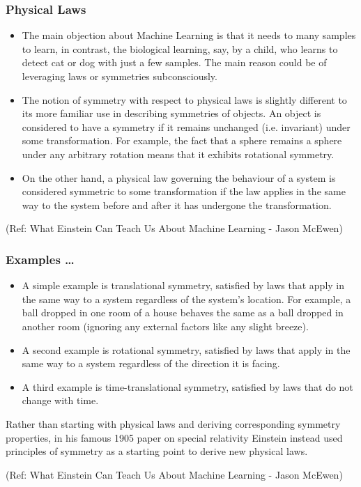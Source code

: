 \begin{frame}[fragile]\frametitle{Physical Laws}


	\begin{itemize}
	\item The main objection about Machine Learning is that it needs to many samples to learn, in contrast, the biological learning, say, by a child, who learns to detect cat or dog with just a few samples.
The main reason could be of leveraging laws or symmetries subconsciously. 
	\item The notion of symmetry with respect to physical laws is slightly different to its more familiar use in describing symmetries of objects. An object is considered to have a symmetry if it remains unchanged (i.e. invariant) under some transformation. For example, the fact that a sphere remains a sphere under any arbitrary rotation means that it exhibits rotational symmetry.
	\item On the other hand, a physical law governing the behaviour of a system is considered symmetric to some transformation if the law applies in the same way to the system before and after it has undergone the transformation.
	\end{itemize}

{\tiny (Ref: What Einstein Can Teach Us About Machine Learning - Jason McEwen)}

\end{frame}

\begin{frame}[fragile]\frametitle{Examples \ldots}


	\begin{itemize}
	\item A simple example is translational symmetry, satisfied by laws that apply in the same way to a system regardless of the system’s location. For example, a ball dropped in one room of a house behaves the same as a ball dropped in another room (ignoring any external factors like any slight breeze).
	\item A second example is rotational symmetry, satisfied by laws that apply in the same way to a system regardless of the direction it is facing.
	\item A third example is time-translational symmetry, satisfied by laws that do not change with time.
	\end{itemize}

Rather than starting with physical laws and deriving corresponding symmetry properties, in his famous 1905 paper on special relativity Einstein instead used principles of symmetry as a starting point to derive new physical laws.

{\tiny (Ref: What Einstein Can Teach Us About Machine Learning - Jason McEwen)}

\end{frame}

